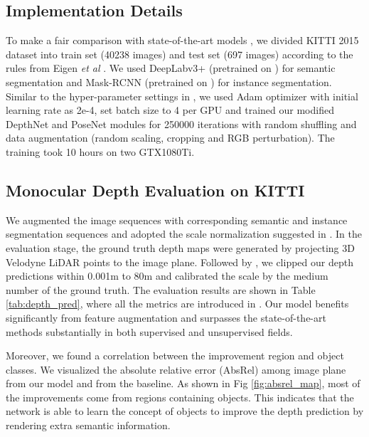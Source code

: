 \documentclass[10pt,twocolumn]{article}
\begin{document}
\subsection{Implementation Details}
To make a fair comparison with state-of-the-art models \cite{eigen2014depth, zhou2017unsupervised, yin2018geonet}, we divided KITTI  2015 dataset into train set (40238 images) and test set (697 images) according to the rules from Eigen \textit{et al} \cite{eigen2014depth}. We used DeepLabv3+ \cite{chen2018encoder} (pretrained on \cite{cordts2016cityscapes})  for semantic segmentation and Mask-RCNN \cite{he2017mask} (pretrained on \cite{lin2014microsoft}) for instance segmentation. Similar to the hyper-parameter settings in \cite{yin2018geonet}, we used Adam optimizer \cite{kingma2014adam} with initial learning rate as 2e-4, set batch size to 4 per GPU and trained our modified DepthNet and PoseNet modules for 250000 iterations with random shuffling and data augmentation (random scaling, cropping and RGB perturbation). The training took 10 hours on two GTX1080Ti.

\subsection{Monocular Depth Evaluation on KITTI}
\label{sec:depth_exps}
We augmented the image sequences with corresponding semantic and instance segmentation sequences and adopted the scale normalization suggested in \cite{wang2018learning}. In the evaluation stage, the ground truth depth maps were generated by projecting 3D Velodyne LiDAR points to the image plane. Followed by \cite{yin2018geonet}, we clipped our depth predictions within 0.001m to 80m and calibrated the scale by the medium number of the ground truth. The evaluation results are shown in Table \ref{tab:depth_pred}, where all the metrics are introduced in \cite{eigen2014depth}. Our model benefits significantly from feature augmentation and surpasses the state-of-the-art methods substantially in both supervised and unsupervised fields. 

Moreover, we found a correlation between the improvement region and object classes. We visualized the absolute relative error (AbsRel) among image plane from our model and from the baseline. As shown in Fig \ref{fig:absrel_map}, most of the improvements come from regions containing objects. This indicates that the network is able to learn the concept of objects to improve the depth prediction by rendering extra semantic information. 
\end{document}
